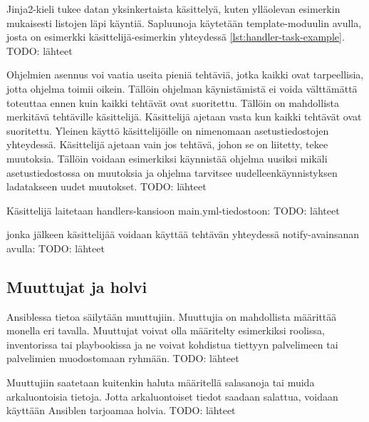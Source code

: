 Jinja2-kieli tukee datan yksinkertaista käsittelyä, kuten ylläolevan esimerkin
mukaisesti listojen läpi käyntiä. Sapluunoja käytetään template-moduulin avulla,
josta on esimerkki käsittelijä-esimerkin yhteydessä \ref{lst:handler-task-example}.
TODO: lähteet

Ohjelmien asennus voi vaatia useita pieniä tehtäviä, jotka kaikki ovat
tarpeellisia, jotta ohjelma toimii oikein. Tällöin ohjelman käynistämistä ei
voida välttämättä toteuttaa ennen kuin kaikki tehtävät ovat suoritettu.
Tällöin on mahdollista merkitävä tehtäville käsittelijä. Käsittelijä ajetaan
vasta kun kaikki tehtävät ovat suoritettu. Yleinen käyttö käsittelijöille
on nimenomaan asetustiedostojen yhteydessä. Käsittelijä ajetaan vain jos
tehtävä, johon se on liitetty, tekee muutoksia. Tällöin voidaan esimerkiksi
käynnistää ohjelma uusiksi mikäli asetustiedostossa on muutoksia ja ohjelma
tarvitsee uudelleenkäynnistyksen ladatakseen uudet muutokset.
TODO: lähteet

Käsittelijä laitetaan handlers-kansioon main.yml-tiedostoon:
TODO: lähteet



jonka jälkeen käsittelijää voidaan käyttää tehtävän yhteydessä notify-avainsanan
avulla:
TODO: lähteet



\subsection{Muuttujat ja holvi}

Ansiblessa tietoa säilytään muuttujiin. Muuttujia on mahdollista määrittää monella
eri tavalla. Muuttujat voivat olla määritelty esimerkiksi roolissa, inventorissa
tai playbookissa ja ne voivat kohdistua tiettyyn palvelimeen tai palvelimien
muodostomaan ryhmään.
TODO: lähteet

Muuttujiin saatetaan kuitenkin haluta määritellä salasanoja tai muida arkaluontoisia
tietoja. Jotta arkaluontoiset tiedot saadaan salattua, voidaan käyttään Ansiblen
tarjoamaa holvia.
TODO: lähteet

